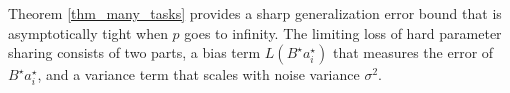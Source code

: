 \begin{theorem}
\end{theorem}
	Theorem \ref{thm_many_tasks} provides a sharp generalization error bound that is asymptotically tight when $p$ goes to infinity.
	The limiting loss of hard parameter sharing consists of two parts, a bias term $L(B^{\star} a_i^{\star})$ that measures the error of $B^{\star} a_i^{\star}$, and a variance term that scales with noise variance $\sigma^2$.

